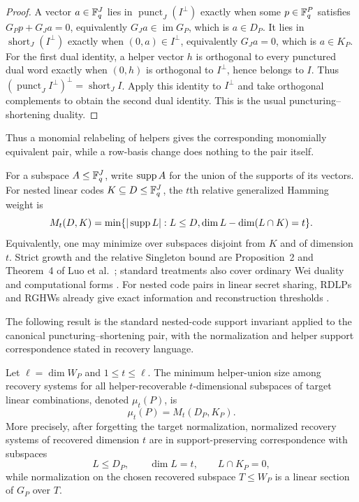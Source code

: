 \begin{proof}
A vector $a\in\mathbb F_q^J$ lies in $\operatorname{punct}_J(I^\perp)$ exactly when
some $p\in\mathbb F_q^P$ satisfies $G_Pp+G_Ja=0$, equivalently
$G_Ja\in\operatorname{im}G_P$, which is $a\in D_P$.  It lies in
$\operatorname{short}_J(I^\perp)$ exactly when $(0,a)\in I^\perp$,
equivalently $G_Ja=0$, which is $a\in K_P$.
For the first dual identity, a helper vector $h$ is orthogonal to every
punctured dual word exactly when $(0,h)$ is orthogonal to $I^\perp$, hence
belongs to $I$.  Thus
$(\operatorname{punct}_J I^\perp)^\perp=\operatorname{short}_J I$.
Apply this identity to $I^\perp$ and take orthogonal complements to obtain
the second dual identity.  This is the usual puncturing--shortening duality.
%
\end{proof}

Thus a monomial relabeling of helpers gives the corresponding monomially
equivalent pair, while a row-basis change does nothing to the pair itself.

For a subspace $A\leq\mathbb F_q^J$, write $\operatorname{supp} A$ for the union of the supports
of its vectors.  For nested linear codes $K\subseteq D\leq\mathbb F_q^J$, the $t$th relative
generalized Hamming weight is
\[
 M_t(D,K)=
 \min\{ |\operatorname{supp} L|:L\leq D,
     \dim L-\dim(L\cap K)=t\}.
\]
Equivalently, one may minimize over subspaces disjoint from $K$ and of
dimension $t$.  Strict growth and the relative Singleton bound are
Proposition~2 and Theorem~4 of Luo et al.~\cite{LuoEtAl2005}; standard
treatments also cover ordinary Wei duality and computational forms
\cite{GeilEtAl2014,SanJose2025}.
For nested code pairs in linear secret sharing, RDLPs and RGHWs already give
exact information and reconstruction thresholds
\cite{KuriharaUyematsuMatsumoto2012}.

The following result is the standard nested-code support invariant applied to
the canonical puncturing--shortening pair, with the normalization and helper
support correspondence stated in recovery language.

\begin{theorem}
\label{thm:relative-weight-recovery}
%
%
Let $\ell=\dim W_P$ and $1\leq t\leq\ell$.  The minimum helper-union size
among recovery systems for all helper-recoverable $t$-dimensional
subspaces of target linear combinations, denoted $\mu_t(P)$, is
\[
 \mu_t(P)=M_t(D_P,K_P).
\]
More precisely, after forgetting the target normalization, normalized recovery
systems of recovered dimension $t$ are in support-preserving correspondence
with subspaces
\[
 L\leq D_P,\qquad \dim L=t,\qquad L\cap K_P=0,
\]
while normalization on the chosen recovered subspace $T\leq W_P$ is a linear
section of $G_P$ over $T$.
\end{theorem}

